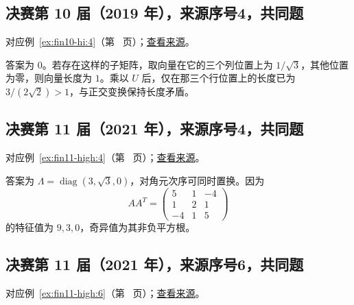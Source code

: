 \documentclass[12pt,fontset=fandol]{ctexart}
\begin{document}
\subsection{决赛第 10 届（2019 年），来源序号4，共同题}\label{ans:fin10-hi:4}\label{pr:fin10-hi:4}

对应例~\ref{ex:fin10-hi:4}（第~\pageref{ex:fin10-hi:4} 页）；\href{https://github.com/lzxcr/cmc-mathematics/blob/64916fa1fdbc3e444a652eca204d5669058ee321/src/problems/finals/10/04.md}{查看来源}。

\begin{solve}

答案为 $0$。若存在这样的子矩阵，取向量在它的三个列位置上为 $1/\sqrt3$，其他位置为零，则向量长度为 $1$。乘以 $U$ 后，仅在那三个行位置上的长度已为 $3/(2\sqrt2)>1$，与正交变换保持长度矛盾。

\end{solve}

\subsection{决赛第 11 届（2021 年），来源序号4，共同题}\label{ans:fin11-high:4}\label{pr:fin11-high:4}

对应例~\ref{ex:fin11-high:4}（第~\pageref{ex:fin11-high:4} 页）；\href{https://github.com/lzxcr/cmc-mathematics/blob/64916fa1fdbc3e444a652eca204d5669058ee321/src/problems/finals/11/04.md}{查看来源}。

\begin{solve}

答案为 $\Lambda=\operatorname{diag}(3,\sqrt3,0)$，对角元次序可同时置换。因为
\[
AA^T=\begin{pmatrix}5&1&-4\\1&2&1\\-4&1&5\end{pmatrix}
\]
的特征值为 $9,3,0$，奇异值为其非负平方根。

\end{solve}

\subsection{决赛第 11 届（2021 年），来源序号6，共同题}\label{ans:fin11-high:6}\label{pr:fin11-high:6}

对应例~\ref{ex:fin11-high:6}（第~\pageref{ex:fin11-high:6} 页）；\href{https://github.com/lzxcr/cmc-mathematics/blob/64916fa1fdbc3e444a652eca204d5669058ee321/src/problems/finals/11/06.md}{查看来源}。
\end{document}
